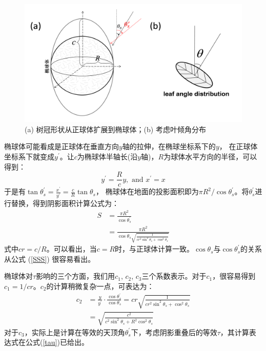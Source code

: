  {
    \begin{figure}[]
    \centering
    \includegraphics[width=0.8\columnwidth]{Figures/辐射过程及辐射通量计算/椭球体树冠.png}
    \caption{(a) 树冠形状从正球体扩展到椭球体；(b) 考虑叶倾角分布}
    \label{fig:椭球体树冠}
    \end{figure}
    }

椭球体可能看成是正球体在垂直方向$y$轴的拉伸，在椭球坐标系下的$y$，
在正球体坐标系下就变成$y^\prime$。让$c$为椭球体半轴长(沿$y$轴)，$R$为球体水平方向的半径，可以得到：
\begin{equation}
y^{\prime}=\frac{R}{c} y, \text { and } x^{\prime}=x
\end{equation}
于是有$\tan{\theta_s^\prime}=\frac{x^\prime}{y^\prime}=\frac{c}{R}{\tan{\theta}}_s$，
椭球体在地面的投影面积即为$\pi R^2/\cos{\theta_s^\prime}$。将$\theta_s^\prime$进行替换，得到阴影面积计算公式为：
\begin{equation}\label{SSS}
\begin{aligned} S &=\frac{\pi R^{2}}{\cos \theta_{s}^{\prime}} \\ &=\frac{\pi R^{2}}{\cos \theta_{s} 
\sqrt{\frac{1}{c r^{2} \sin ^{2} \theta_{s}+\cos ^{2} \theta_{s}}}} \end{aligned}
\end{equation}
式中$cr=c/R$。可以看出，当$c=R$时，与正球体计算一致。$\cos{\theta_s}$与$\cos{\theta_s^\prime}$的关系从公式 (\ref{SSS}) 很容易看出。%


椭球体对$\tau$影响的三个方面，我们用$c_1$, $c_2$, $c_3$三个系数表示。对于$c_1$，很容易得到$c_1=1/cr$。$c_2$的计算稍微复杂一点，可表达为：
\begin{equation}
\begin{aligned} c_2 &=\frac{y}{y^{\prime}} \cdot \frac{\cos \theta_{s}^{\prime}}{\cos \theta_{s}}=
    c r \sqrt{\frac{1}{c r^{2} \sin ^{2} \theta_{s}+\cos ^{2} \theta_{s}}} \\ &=
    \sqrt{\frac{c^{2}}{c^{2} \sin ^{2} \theta_{s}+R^{2} \cos ^{2} \theta_{s}}} \end{aligned}
\end{equation}
对于$c_3$，实际上是计算在等效的天顶角$\theta_s^\prime$下，考虑阴影重叠后的等效$\tau$，其计算表达式在公式(\ref{tau})已给出。

